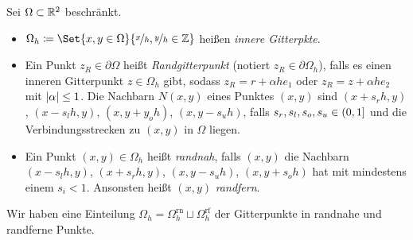 \documentclass{cheat-sheet}
\newcommand{\bOmega}{\partial \Omega} %
\newcommand{\rn}{\text{rn}} %
\newcommand{\rf}{\text{rf}} %
\begin{document}
\begin{situation}
  Sei $\Omega \subset \mathbb{R}^2$ beschränkt.
\end{situation}

\begin{defn}
  \begin{itemize}
    \item $\Omega_h \coloneqq \Set{x, y \in \Omega}{\nicefrac{x}{h}, \nicefrac{y}{h} \in \Z}$ heißen \emph{innere Gitterpkte}.
    \item Ein Punkt $z_R \in \bOmega$ heißt \emph{Randgitterpunkt} (notiert $z_R \in \bOmega_h$), falls es einen inneren Gitterpunkt $z \in \Omega_h$ gibt, sodass $z_R = r + \alpha h e_1$ oder $z_R = z + \alpha h e_2$ mit $\lvert\alpha\rvert \leq 1$.
    Die Nachbarn $N(x, y)$ eines Punktes $(x, y)$ sind $(x + s_r h, y)$, $(x - s_l h, y)$, $(x, y + y_o h)$, $(x, y - s_u h) $, falls $s_r, s_l, s_o, s_u \in \left( 0, 1 \right]$ und die Verbindungsstrecken zu $(x, y)$ in $\Omega$ liegen.
    \item Ein Punkt $(x, y) \in \Omega_h$ heißt \emph{randnah}, falls $(x, y)$ die Nachbarn $(x - s_l h, y)$, $(x + s_r h, y)$, $(x, y - s_u h)$, $(x, y+ s_o h)$ hat mit mindestens einem $s_i < 1$.
    Ansonsten heißt $(x, y)$ \emph{randfern}.
  \end{itemize}
\end{defn}

\begin{nota}
  Wir haben eine Einteilung $\Omega_h = \Omega_h^\rn \sqcup \Omega_h^\rf$ der Gitterpunkte in randnahe und randferne Punkte.
\end{nota}
\end{document}
